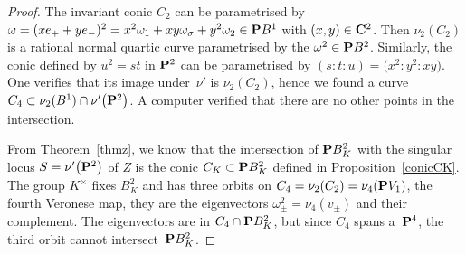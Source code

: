 \documentclass[10pt,a4paper]{amsart}
\numberwithin{equation}{section}
\begin{document}
\begin{proof}The invariant conic $C_2$ can be parametrised by
$\omega=(xe_++ye_-)^2=x^2\omega_1+xy\omega_\sigma+y^2\omega_2\in {\bf P} B^1$
with $(x,y)\in{\bf C}^2$. Then $\nu_2(C_2)$ is a rational normal quartic curve
parametrised by the $\omega^2\in{\bf P} B^2$.
Similarly, the conic defined by
$u^2=st$ in ${\bf P}^2$ can be parametrised by $(s:t:u)=\big(x^2:y^2:xy\big)$.
One verifies that its image under~$\nu'$ is $\nu_2(C_2)$,
hence we found a curve $C_4\subset \nu_2(B^1)\cap \nu'\big({\bf P}^2\big)$.
A computer verified that there are no other points in the intersection.

From Theorem~\ref{thmz},
we know that the intersection of ${\bf P} B^2_K$ with the singular locus $S=\nu'\big({\bf P}^2\big)$ of $Z$
is the conic $C_K\subset {\bf P} B^2_K$ defined in Proposition~\ref{conicCK}.
The group $K^\times$ fixes $B^2_K$ and
has three orbits on $C_4=\nu_2(C_2)=\nu_4({\bf P} V_1)$, the fourth Veronese map,
they are the eigenvectors $\omega_\pm^2=\nu_4(v_\pm)$ and their complement.
The eigenvectors are in $C_4\cap {\bf P} B^2_K$,
but since $C_4$ spans a~${\bf P}^4$, the third orbit cannot intersect~${\bf P} B^2_K$.
\end{proof}
\end{document}
